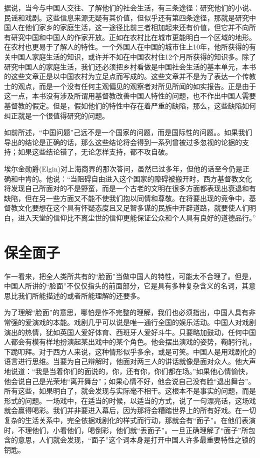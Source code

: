 \documentclass[12pt,oneside]{book}
\begin{document}
\begin{common-format}
据说，当今与中国人交往、了解他们的社会生活，有三条途径：研究他们的小说、民谣和戏剧。这些信息来源无疑有其价值，但似乎还有第四条途径，那就是研究中国人在他们家乡的家庭生活，这一途径比前三者相加起来还有价值，但它并不向所有研究中国和中国人的作家开放。正如在农村比在城市更能明白一个区域的地形。在农村也更易于了解人的特性。一个外国人在中国的城市住上10年，他所获得的有关中国人家庭生活的知识，或许并不如在中国农村住12个月所获得的知识多。除了研究中国人的家庭生活，我们还必须把乡村看做是中国社会生活的基本单元，本书的这些文章正是以中国农村为立足点而写成的。这些文章并不是为了表达一个传教士的观点，而是一个没有任何主观偏见的观察者对所见所闻的如实报告。正是由于这一点，本书没有涉及所谓用基督教改善中国人特性的问题，也不作出中国人需要基督教的假定。但是，假如他们的特性中存在着严重的缺陷，那么，这些缺陷如何纠正就是一个很值得研究的问题。 

如前所述，“中国问题”己远不是一个国家的问题，而是国际性的问题。。如果我们导出的结论是正确的话，那么这些结论将会得到一系列曾被过多忽视的论据的支持；如果这些结论错了，无论怎样支持，都不攻自破。 

埃尔金勋爵(Elgin)对上海商界的那次答问，虽然已过多年，但他的话至今仍是正确和中肯的。他说：“当阻碍自由进入这个国家的障碍被搬开时，西方基督教文化将发现自己所面对的不是野蛮，而是一个古老的文明在很多方面都表现出衰退和有缺陷，但在另一些方面又不能不使我们抱以同情和尊敬。在将要出现的竞争中，基督教文化要想在这个具有怀疑态度且又足智多谋的民族中开辟道路，就要使人们明白，进入天堂的信仰比不离尘世的信仰更能保证公众和个人具有良好的道德品行。”


\chapter{保全面子}
乍一看来，把全人类所共有的“脸面”当做中国人的特性，可能太不合理了。但是，中国人所讲的“脸面”不仅仅指头的前面部分，它是具有多种复杂含义的名词，其意思比我们所能描述的或者所能理解的还要多。 

为了理解“脸面”的意思，哪怕是作不完整的理解，我们也必须指出，中国人具有非常强的爱演戏的本能。戏剧几乎可以说是唯一通行全国的娱乐活动。中国人对戏剧演出的热情，犹如英国人爱好体育、西班牙人爱好斗牛。只要略加鼓动，任何中国人都会有模有样地扮演起某出戏中的某个角色。他会摆出演戏的姿势，鞠躬行礼，下跪叩拜。对于西方人来说，这种情形似乎多余，或是可笑。中国人是用戏剧化的语言进行思维。当要为自己辩解时，他面对两三人的讲话就像是面对众人。他大声地说道：“我是当着你们的面说的，你，还有你，你们都在场。”如果他心情愉快，他会说自己是光荣地“离开舞台”；如果心情不好，他会说自己没有脸“退出舞台”。所有这些，如果明白了，就会发现与实际毫不相干。这根本不是事实的问题，而是形式的问题。一场戏中，在适当的时候，以适当的方式，说了一句漂亮话，这场戏就会赢得喝彩。我们并非要进入幕后，因为那将会糟踏世界上的所有好戏。在一切复杂的生活关系中，完全依据戏剧化的样式而行动，那就会有“面子”。在他们表演时，不理他们，小看他们，喝倒彩，他们就“丢面子”。一旦正确理解了“面子”所包含的意思，人们就会发现，“面子”这个词本身是打开中国人许多最重要特性之锁的钥匙。


\end{common-format}
\end{document}
